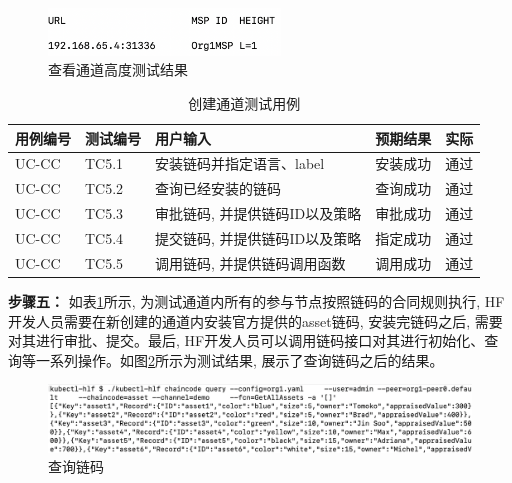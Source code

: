 \begin{figure}[h] %
    \centering %
    \includegraphics[width=0.55\textwidth]{FIGs/chapter5/channel.png} %
    \caption{查看通道高度测试结果} %
    \label{channel_test_result} %
\end{figure}%

{\footnotesize
\begin{longtable}[h]{m{45pt} m{45pt} m{180pt} m{50pt} m{20pt}}
    \caption[创建通道测试用例]{创建通道测试用例} \label{chaincode_test}\\
        \hline  
        用例编号&测试编号&用户输入&预期结果&实际\\
        \hline
        UC-CC & TC5.1 & 安装链码并指定语言、label & 安装成功 & 通过 \\
        \hline
        UC-CC & TC5.2 & 查询已经安装的链码 & 查询成功 & 通过 \\
        \hline
        UC-CC & TC5.3 & 审批链码, 并提供链码ID以及策略 & 审批成功 & 通过 \\
        \hline
        UC-CC & TC5.4 & 提交链码, 并提供链码ID以及策略 & 指定成功 & 通过 \\
        \hline
        UC-CC & TC5.5 & 调用链码, 并提供链码调用函数 & 调用成功 & 通过 \\
        \hline
    \end{longtable} 
}

\textbf{步骤五：} 如表\ref{chaincode_test}所示, 为测试通道内所有的参与节点按照链码的合同规则执行, HF开发人员需要在新创建的通道内安装官方提供的asset\footnotemark[1]链码, 安装完链码之后, 需要对其进行审批、提交。最后, HF开发人员可以调用链码接口对其进行初始化、查询等一系列操作。如图\ref{chaincode_test_result}所示为测试结果, 展示了查询链码之后的结果。

\begin{figure}[h] %
    \centering %
    \includegraphics[width=1.0\textwidth]{FIGs/chapter5/chaincode.png} %
    \caption{查询链码} %
    \label{chaincode_test_result} %
\end{figure}%


